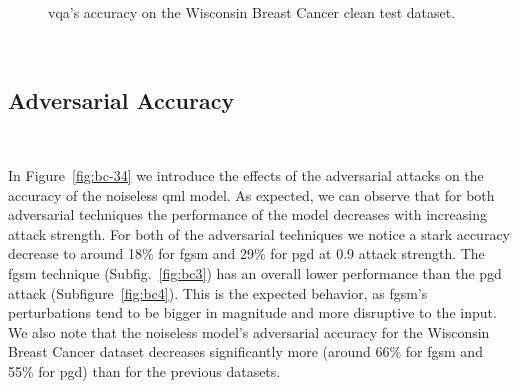\begin{figure}[!h]
  \caption{\ac{vqa}'s accuracy on the Wisconsin Breast Cancer clean test dataset.}
  \label{fig:bc-12}
\end{figure} \

\subsection{Adversarial Accuracy}\label{subsection:breast-cancer-adv-acc} \

In Figure~\ref{fig:bc-34} we introduce the effects of the
adversarial attacks on the accuracy of the noiseless \ac{qml}
model. As expected, we can observe that for both adversarial
techniques the performance of the model decreases with increasing
attack strength. For both of the adversarial techniques
we notice a stark accuracy decrease to around 18\% for \ac{fgsm}
and 29\% for \ac{pgd} at 0.9 attack strength. The \ac{fgsm} technique
(Subfig.~\ref{fig:bc3}) has an overall lower performance than the
\ac{pgd} attack (Subfigure~\ref{fig:bc4}). This is the expected
behavior, as \ac{fgsm}'s perturbations tend to be bigger in
magnitude and more disruptive to the input. We also note that the
noiseless model's adversarial accuracy for the Wisconsin Breast
Cancer dataset decreases significantly more (around 66\% for
\ac{fgsm} and 55\% for \ac{pgd}) than for the previous datasets. \

